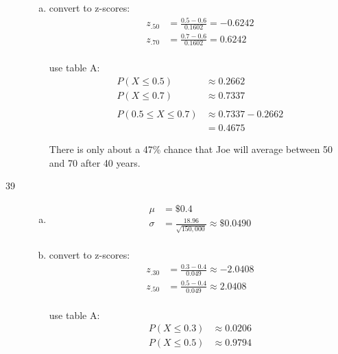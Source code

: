\documentclass[letterpaper]{exam}
\newcommand{\cent}{\textcent\xspace}
\begin{document}
\begin{description}
\begin{enumerate}[(a)]
          \item
            convert to z-scores:
            \begin{align*}
              z_{.50} &= \frac{0.5 - 0.6}{0.1602} = -0.6242 \\
              z_{.70} &= \frac{0.7 - 0.6}{0.1602} = 0.6242 \\
            \end{align*}

            use table A:\@
            \begin{align*}
              P(X \leq 0.5) &\approx 0.2662 \\
              P(X \leq 0.7) &\approx 0.7337 \\
              \\
              P(0.5 \leq X \leq 0.7) & \approx 0.7337 - 0.2662 \\
                                     & = \boxed{ 0.4675 }
            \end{align*}

            There is only about a 47\% chance that Joe will average between
            50\cent{} and 70\cent{} after 40 years.

        \end{enumerate}

      \item[39]
        \begin{enumerate}[(a)]
          \item 
            \begin{align*}
              \mu    & = \boxed{ \$0.4 } \\
              \sigma & = \frac{18.96}{\sqrt{150,000}} \approx \boxed{ \$0.0490 }\\
            \end{align*}
            
          \item
            convert to z-scores:
            \begin{align*}
              z_{.30} &= \frac{0.3 - 0.4}{0.049} \approx -2.0408 \\ 
              z_{.50} &= \frac{0.5 - 0.4}{0.049} \approx 2.0408 \\
            \end{align*}

            use table A:\@
            \begin{align*}
              P(X \leq 0.3) &\approx 0.0206 \\
              P(X \leq 0.5) &\approx 0.9794 \\
            \end{align*}


\end{enumerate}
\end{description}
\end{document}
